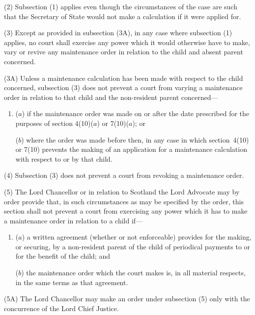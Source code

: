 \documentclass[12pt,a4paper]{article}
\begin{document}
(2)
Subsection (1) applies even though the circumstances of the case are such
that the Secretary of State would not make a calculation if it were
applied for.

(3)
Except as provided in subsection (3A), in any case where subsection (1)
applies, no court shall exercise any power which it would otherwise have to make,
vary or revive any maintenance order in relation to the child and absent parent
concerned.

(3A) Unless a maintenance calculation has been made with respect to the child
concerned, subsection (3) does not prevent a court from varying a maintenance
order in relation to that child and the non-resident parent concerned---
\begin{enumerate}\item[]
($a$)
if the maintenance order was made on or after the date prescribed for the
purposes of section 4(10)($a$) or 7(10)($a$); or

($b$)
where the order was made before then, in any case in which section~4(10)
or 7(10) prevents the making of an application for a maintenance
calculation with respect to or by that child.
\end{enumerate}

(4)
Subsection (3) does not prevent a court from revoking a maintenance order.

(5)
The Lord Chancellor or in relation to Scotland the Lord Advocate may by order
provide that, in such circumstances as may be specified by the order, this section shall
not prevent a court from exercising any power which it has to make a maintenance
order in relation to a child if---
\begin{enumerate}\item[]
($a$)
a written agreement (whether or not enforceable) provides for the
making, or securing, by a non-resident parent
of the
child of periodical payments to or for the benefit of the child; and

($b$)
the maintenance order which the court makes is, in all material respects,
in the same terms as that agreement.
\end{enumerate}


(5A)
The Lord Chancellor may make an order under subsection (5) only with the
concurrence of the Lord Chief Justice.
\end{document}
